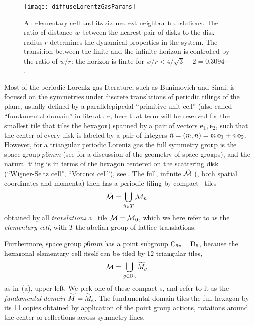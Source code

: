 

\begin{figure}[htbp]
	\begin{center}
    \texttt{[image: diffuseLorentzGasParams]}
	\end{center}
	\caption[]{\label{fig-LorentzGasParams}
    An elementary cell and its six nearest neighbor translations. The ratio of
    distance $w$ between the nearest pair of disks to the disk radius $r$
    determines the dynamical properties in the system. The transition
    between the finite and the infinite horizon is controlled by the
    ratio of $w/r$: the horizon is finite for $w/r < 4/\sqrt{3}-2
    =0.3094\cdots$.
	}
\end{figure}

Most of the periodic Lorentz gas literature, such as Bunimovich and
Sinai, is focused on the symmetries under discrete
translations of periodic tilings of the plane, usually defined by a
parallelepipedal ``primitive unit cell''
(also called ``fundamental domain'' in literature; here that term will
be reserved for the smallest tile that tiles the hexagon)
spanned by a pair of vectors
$\textbf{e}_1,\textbf{e}_2$, such that the center of every disk is
labeled by a pair of integers
$\hat{n}=(m,n)=m\,\textbf{e}_1+n\,\textbf{e}_2$.
However, for a triangular periodic Lorentz gas the full symmetry group is
the space group $p6mm$ (see  for a discussion of the
geometry of space groups), and the natural tiling is in terms of the
hexagon centered on the scattering disk (``Wigner-Seitz cell'', ``Voronoi
cell''),  see .
The full, infinite {\statesp} $\hat {{\cal M}}$ (\ie, both spatial coordinates and
momenta) then has a periodic tiling by compact \statesp\ tiles
\[ %
\hM=\bigcup_{ \hn \in T} \pS_{\hn},
\] %
obtained by all {\em translations} a \statesp\ tile ${\cal M}={\cal M}_{0}$, which
we here refer to as the {\em elementary cell}, with $T$ the abelian group
of lattice translations.

Furthermore, space group $p6mm$ has a point subgroup $\textrm{C}_{6v}=\textrm{D}_{6}$,
because the hexagonal elementary cell itself can be tiled by 12
triangular tiles,
\[ %
\pS=\bigcup_{\LieEl \in \Dn{6}} \tM_\LieEl,
\] %
as in \,(a), upper left. We pick one of these
compact \statesp s, and refer to it as the
\emph{fundamental domain} ${\widetilde M}={\widetilde M}_e$. The fundamental domain tiles the
full hexagon by its 11 copies obtained by application of the  point
group actions, rotations around the center or reflections across symmetry
lines.

